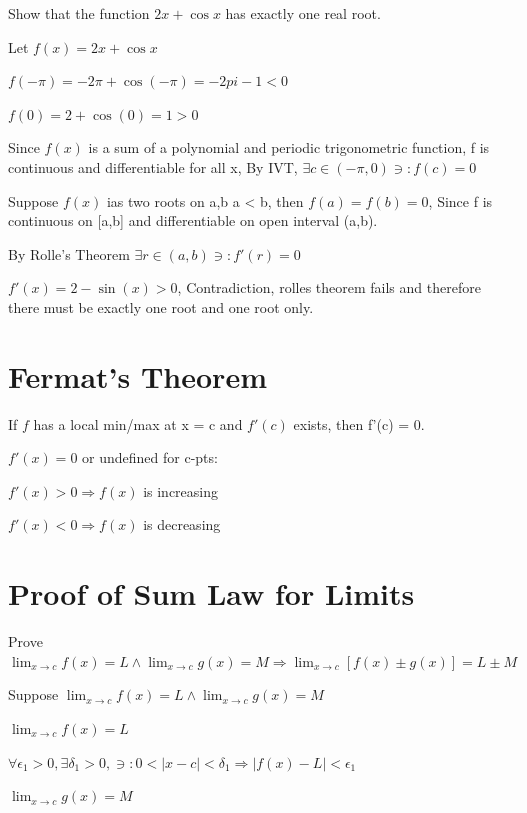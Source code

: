 \documentclass{article}
\begin{document}
Show that the function $2x + \cos x$ has exactly one real root.

Let $f(x) = 2x + \cos x$

$f(- \pi) = -2\pi + \cos(-\pi) = -2pi - 1 < 0$

$f(0) = 2 + \cos(0) = 1 > 0$

Since $f(x)$ is a sum of a polynomial and periodic trigonometric function, f is continuous and differentiable for all x, By IVT, $\exists c \in (-\pi ,0) \ni: f(c) = 0$

Suppose $f(x)$ ias two roots  on a,b a < b, then $f(a) = f(b) = 0$, Since f is continuous on [a,b] and differentiable on open interval (a,b).

By Rolle's Theorem $\exists r \in (a,b) \ni: f'(r) = 0$

$f'(x) = 2 - \sin(x) > 0$, Contradiction, rolles theorem fails and therefore there must be exactly one root and one root only. 

\pagebreak

\text{}

\section{Fermat's Theorem}


If $f$ has a local min/max at x = c and $f'(c)$ exists, then f'(c) = 0.

$f'(x) = 0$ or undefined for c-pts:

$f'(x) > 0 \Rightarrow f(x)$ is increasing

$f'(x) < 0 \Rightarrow f(x)$ is decreasing

\section{Proof of Sum Law for Limits}

Prove $\displaystyle \lim_{x \to c} f(x) = L \land \lim_{x \to c} g(x) = M \Longrightarrow \lim_{x \to c} [f(x) \pm g(x)] = L \pm M$

Suppose $\displaystyle \lim_{x \to c} f(x) = L \land \lim_{x \to c} g(x) = M$

$\displaystyle \lim_{x \to c} f(x) = L$

$\forall \epsilon_1 > 0, \exists \delta_1 > 0, \ni : 0 < |x - c| <\delta_1 \Longrightarrow |f(x) - L| < \epsilon_1$

\vspace{0.3cm}

$\displaystyle \lim_{x \to c} g(x) = M$
\end{document}
